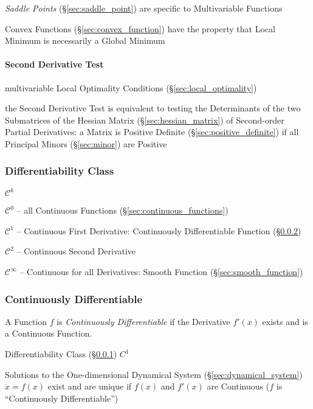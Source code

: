 \fist \emph{Saddle Points} (\S\ref{sec:saddle_point}) are specific to
Multivariable Functions

Convex Functions (\S\ref{sec:convex_function}) have the property that Local
Minimum is necessarily a Global Minimum



\paragraph{Second Derivative Test}\label{sec:second_derivative_test}\hfill

\fist multivariable Local Optimality Conditions (\S\ref{sec:local_optimality})

the Second Derivative Test is equivalent to testing the Determinants of the two
Submatrices of the Hessian Matrix (\S\ref{sec:hessian_matrix}) of Second-order
Partial Derivatives: a Matrix is Positive Definite
(\S\ref{sec:positive_definite}) if all Principal Minors (\S\ref{sec:minor}) are
Positive



\subsubsection{Differentiability Class}\label{sec:differentiability_class}

$\mathcal{C}^k$

$\mathcal{C}^0$ -- all Continuous Functions (\S\ref{sec:continuous_functions})

$\mathcal{C}^1$ -- Continuous First Derivative: Continuously Differentiable
Function (\S\ref{sec:continuously_differentiable})

$\mathcal{C}^2$ -- Continuous Second Derivative

$\mathcal{C}^\infty$ -- Continuous for all Derivatives: Smooth Function
(\S\ref{sec:smooth_function})



\subsubsection{Continuously Differentiable}
\label{sec:continuously_differentiable}

A Function $f$ is \emph{Continuously Differentiable} if the Derivative $f'(x)$
exists and is a Continuous Function.

Differentiability Class (\S\ref{sec:differentiability_class}) $C^1$

Solutions to the One-dimensional Dynamical System
(\S\ref{sec:dynamical_system}) $\dot{x} = f(x)$ exist and are unique if $f(x)$
and $f'(x)$ are Continuous ($f$ is ``Continuously Differentiable'')



